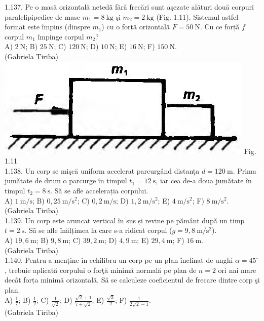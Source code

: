 1.137. Pe o masă orizontală netedã fără frecări sunt aşezate alături două corpuri paralelipipedice de mase $m_{1}=8 \mathrm{~kg}$ şi $m_{2}=2 \mathrm{~kg}$ (Fig. 1.11). Sistemul astfel format este împins (dinspre $m_{1}$) cu o forță orizontală $F=50 \mathrm{~N}$. Cu ce forță $f$ corpul $m_{1}$ împinge corpul $m_{2}$?\\ A) $2 \mathrm{~N}$; B) $25 \mathrm{~N}$; C) $120 \mathrm{~N}$; D) $10 \mathrm{~N}$; E) $16 \mathrm{~N}$; F) $150 \mathrm{~N}$.\\ (Gabriela Tiriba)\\ \includegraphics[width=0.4\linewidth]{images/2025_07_01_5b3ff9fa0d508c8e9f17g-033} Fig. 1.11\\

1.138. Un corp se mişcă uniform accelerat parcurgând distanța $d=120 \mathrm{~m}$. Prima jumătate de drum o parcurge în timpul $t_{1}=12 \mathrm{~s}$, iar cea de-a doua jumătate în timpul $t_{2}=8 \mathrm{~s}$. Să se afle accelerația corpului.\\ A) $1 \mathrm{~m} / \mathrm{s}$; B) $0,25 \mathrm{~m} / \mathrm{s}^{2}$; C) $0,2 \mathrm{~m} / \mathrm{s}$; D) $1,2 \mathrm{~m} / \mathrm{s}^{2}$; E) $4 \mathrm{~m} / \mathrm{s}^{2}$; F) $8 \mathrm{~m} / \mathrm{s}^{2}$.\\ (Gabriela Tiriba)\\

1.139. Un corp este aruncat vertical în sus și revine pe pământ după un timp $t=2 \mathrm{~s}$. Sã se afle înălțimea la care s-a ridicat corpul ($g=9,8 \mathrm{~m} / \mathrm{s}^{2}$).\\ A) $19,6 \mathrm{~m}$; B) $9,8 \mathrm{~m}$; C) $39,2 \mathrm{~m}$; D) $4,9 \mathrm{~m}$; E) $29,4 \mathrm{~m}$; F) $16 \mathrm{~m}$.\\ (Gabriela Tiriba)\\

1.140. Pentru a menține în echilibru un corp pe un plan înclinat de unghi $\alpha=45^{\circ}$, trebuie aplicată corpului o forţă minimă normală pe plan de $n=2$ ori nai mare decât forța minimă orizontală. Să se calculeze coeficientul de frecare dintre corp şi plan.\\ A) $\frac{1}{7}$; B) $\frac{1}{2}$; C) $\frac{1}{\sqrt{2}}$; D) $\frac{\sqrt{2}+1}{7+\sqrt{2}}$; E) $\frac{\sqrt{3}}{2}$; F) $\frac{1}{2 \sqrt{2}-1}$. \\ (Gabriela Tiriba)\\

